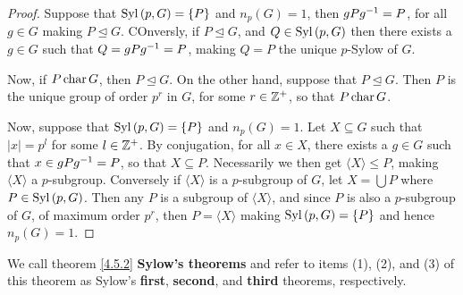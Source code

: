 \begin{proof}
  Suppose that $\operatorname{Syl}{(p,G)}=\{P\}$ and $n_p(G)=1$, then $gPg^{-1}=P$, for
  all $g \in G$ making $P \unlhd G$. COnversly, if $P \unlhd G$, and  $Q \in
  \operatorname{Syl}{(p,G)}$ then there exists a $g \in G$ such that  $Q=gPg^{-1}=P$, making
  $Q=P$ the unique $p$-Sylow of $G$.

  Now, if  $P \operatorname{char} G$, then  $P \unlhd G$. On the other hand, suppose that
  $P \unlhd G$. Then  $P$ is the unique group of order $p^r$ in $G$, for some
  $r \in \mathbb{Z}^+$, so that  $P \operatorname{char} G$.

  Now, suppose that $\operatorname{Syl}{(p,G)}=\{P\}$ and $n_p(G)=1$. Let $X \subseteq G$
  such that $|x|=p^l$ for some $l \in \mathbb{Z}^+$. By conjugation, for all  $x
  \in X$, there exists a  $g \in G$ such that  $x \in gPg^{-1}=P$, so that
  $X \subseteq P$. Necessarily we then get  $\langle X \rangle \leq P$,
  making $\langle X \rangle$ a $p$-subgroup. Conversely if  $\langle X
  \rangle$ is a $p$-subgroup of $G$, let $X=\bigcup{P}$ where $P \in
  \operatorname{Syl}{(p,G)}$. Then any $P$ is a subgroup of  $\langle X \rangle$, and since
  $P$ is also a $p$-subgroup of  $G$, of maximum order $p^r$, then
  $P=\langle X \rangle$ making $\operatorname{Syl}{(p,G)}=\{P\}$ and hence $n_p(G)=1$.
\end{proof}

\begin{remark}
  We call theorem \ref{4.5.2} \textbf{Sylow's theorems} and refer to items
  (1), (2), and (3) of this theorem as Sylow's \textbf{first},
  \textbf{second}, and \textbf{third} theorems, respectively.
\end{remark}

